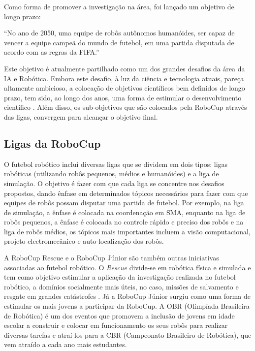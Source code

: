 Como forma de promover a investigação na área, foi lançado um objetivo de longo prazo: 

“No ano de 2050, uma equipe de robôs autônomos humanóides, ser capaz de vencer a 
equipe campeã do mundo de futebol, em uma partida disputada de acordo com as regras da 
FIFA.” \cite{Kitano97} 

Este objetivo é atualmente partilhado como um dos grandes desafios da área da IA e Robótica. 
Embora este desafio, à luz da ciência e tecnologia atuais, pareça altamente ambicioso, a colocação de objetivos científicos
bem definidos de longo prazo, tem sido, ao longo dos anos, uma forma de estimular o desenvolvimento científico \cite{robocup}. 
Além disso, os sub-objetivos que são colocados pela RoboCup através das ligas, convergem para alcançar o objetivo final.

\subsection{Ligas da RoboCup}
\label{subsec:ligasdarobocup}
O futebol robótico inclui diversas ligas que se dividem em dois tipos: ligas robóticas (utilizando robôs pequenos, médios e 
humanóides) e a liga de simulação. O objetivo é fazer com que cada liga se concentre nos desafios propostos, dando ênfase em 
determinados tópicos necessários para fazer com que equipes de robôs possam disputar uma partida de futebol. Por exemplo, 
na liga de simulação, a ênfase é colocada na coordenação em SMA, enquanto na liga de robôs pequenos, a ênfase é colocada no 
controle rápido e preciso dos robôs e na liga de robôs médios, os tópicos mais importantes incluem a visão computacional, 
projeto electromecânico e auto-localização dos robôs.

A RoboCup Rescue \cite{kitano99} e o RoboCup Júnior \cite{sklar02} são também outras iniciativas associadas ao futebol robótico. 
O {\it Rescue} divide-se em robótica física e simulada e tem como objetivo estimular a aplicação da investigação realizada no futebol 
robótico, a domínios socialmente mais úteis, no caso, missões de salvamento e resgate em grandes catástrofes \cite{rescue01}. Já 
a RoboCup Júnior surgiu como uma forma de estimular os mais jovens a participar da RoboCup. A OBR (Olimpíada Brasileira de Robótica) 
é um dos eventos que promovem a inclusão de jovens em idade escolar a construir e colocar em funcionamento os seus robôs para 
realizar diversas tarefas e atraí-los para a CBR (Campeonato Brasileiro de Robótica), que vem atraído a cada ano mais estudantes.

